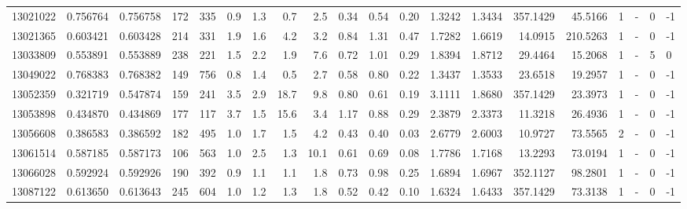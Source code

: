 \begin{tabular}{rrrrrrrrrrrrrrrrrlrl}
  13021022 & 0.756764 &   0.756758 &  172 &  335 &      0.9 &      1.3 &     0.7 &      2.5 &       0.34 &        0.54 &        0.20 &  1.3242 &  1.3434 &  357.1429 &   45.5166 &       1 &             - &        0 &        -1 \\
  13021365 & 0.603421 &   0.603428 &  214 &  331 &      1.9 &      1.6 &     4.2 &      3.2 &       0.84 &        1.31 &        0.47 &  1.7282 &  1.6619 &   14.0915 &  210.5263 &       1 &             - &        0 &        -1 \\
  13033809 & 0.553891 &   0.553889 &  238 &  221 &      1.5 &      2.2 &     1.9 &      7.6 &       0.72 &        1.01 &        0.29 &  1.8394 &  1.8712 &   29.4464 &   15.2068 &       1 &             - &        5 &         0 \\
  13049022 & 0.768383 &   0.768382 &  149 &  756 &      0.8 &      1.4 &     0.5 &      2.7 &       0.58 &        0.80 &        0.22 &  1.3437 &  1.3533 &   23.6518 &   19.2957 &       1 &             - &        0 &        -1 \\
  13052359 & 0.321719 &   0.547874 &  159 &  241 &      3.5 &      2.9 &    18.7 &      9.8 &       0.80 &        0.61 &        0.19 &  3.1111 &  1.8680 &  357.1429 &   23.3973 &       1 &             - &        0 &        -1 \\
  13053898 & 0.434870 &   0.434869 &  177 &  117 &      3.7 &      1.5 &    15.6 &      3.4 &       1.17 &        0.88 &        0.29 &  2.3879 &  2.3373 &   11.3218 &   26.4936 &       1 &             - &        0 &        -1 \\
  13056608 & 0.386583 &   0.386592 &  182 &  495 &      1.0 &      1.7 &     1.5 &      4.2 &       0.43 &        0.40 &        0.03 &  2.6779 &  2.6003 &   10.9727 &   73.5565 &       2 &             - &        0 &        -1 \\
  13061514 & 0.587185 &   0.587173 &  106 &  563 &      1.0 &      2.5 &     1.3 &     10.1 &       0.61 &        0.69 &        0.08 &  1.7786 &  1.7168 &   13.2293 &   73.0194 &       1 &             - &        0 &        -1 \\
  13066028 & 0.592924 &   0.592926 &  190 &  392 &      0.9 &      1.1 &     1.1 &      1.8 &       0.73 &        0.98 &        0.25 &  1.6894 &  1.6967 &  352.1127 &   98.2801 &       1 &             - &        0 &        -1 \\
  13087122 & 0.613650 &   0.613643 &  245 &  604 &      1.0 &      1.2 &     1.3 &      1.8 &       0.52 &        0.42 &        0.10 &  1.6324 &  1.6433 &  357.1429 &   73.3138 &       1 &             - &        0 &        -1 \\

\end{tabular}
